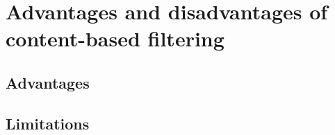 \section{Advantages and disadvantages of content-based filtering}\label{sec:cbf_advantages_disadvantages} %

\subsection{Advantages} %

\subsection{Limitations} %

